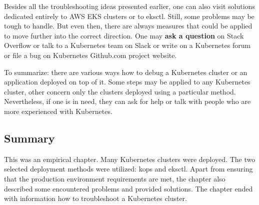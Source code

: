 Besides all the troubleshooting ideas presented earlier, one can also visit solutions dedicated entirely to AWS EKS clusters\cite{k8s-eks-tr} or to eksctl\cite{k8s-eksctl-tr}. Still, some problems may be tough to handle. But even then, there are always measures that could be applied to move further into the correct direction. One may \textbf{ask a question} on Stack Overflow or talk to a Kubernetes team on Slack or write on a Kubernetes forum or file a bug on Kubernetes Github.com project website\cite{k8s-deb-ask}.

To summarize: there are various ways how to debug a Kubernetes cluster or an application deployed on top of it. Some steps may be applied to any Kubernetes cluster, other concern only the clusters deployed using a particular method. Nevertheless, if one is in need, they can ask for help or talk with people who are more experienced with Kubernetes.

\subsection{Summary}

This was an empirical chapter. Many Kubernetes clusters were deployed. The two selected deployment methods were utilized: kops and eksctl. Apart from ensuring that the production environment requirements are met, the chapter also described some encountered problems and provided solutions. The chapter ended with information how to troubleshoot a Kubernetes cluster.
